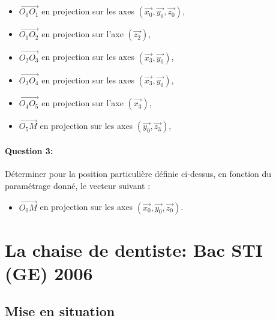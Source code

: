 \begin{itemize}
 \item $\overrightarrow{O_{0}O_1}$ en projection sur les axes $\left(\overrightarrow{x_0},\overrightarrow{y_0},\overrightarrow{z_0}\right)$,
  \item $\overrightarrow{O_{1}O_2}$ en projection sur l'axe $\left(\overrightarrow{z_2}\right)$,
 \item $\overrightarrow{O_{2}O_3}$ en projection sur les axes $\left(\overrightarrow{x_3},\overrightarrow{y_0}\right)$,
 \item $\overrightarrow{O_{3}O_4}$ en projection sur les axes $\left(\overrightarrow{x_3},\overrightarrow{y_0}\right)$,
 \item $\overrightarrow{O_{4}O_5}$ en projection sur l'axe $\left(\overrightarrow{x_3}\right)$,
 \item $\overrightarrow{O_{5}M}$ en projection sur les axes $\left(\overrightarrow{y_0},\overrightarrow{z_3}\right)$,
\end{itemize}

\paragraph{Question 3:}

Déterminer pour la position particulière définie ci-dessus, en fonction du paramétrage donné, le vecteur suivant :

\begin{itemize}
 \item $\overrightarrow{O_{0}M}$ en projection sur les axes $\left(\overrightarrow{x_0},\overrightarrow{y_0},\overrightarrow{z_0}\right)$.
\end{itemize}

\newpage

\section{La chaise de dentiste: Bac STI (GE) 2006}

\subsection{Mise en situation}

